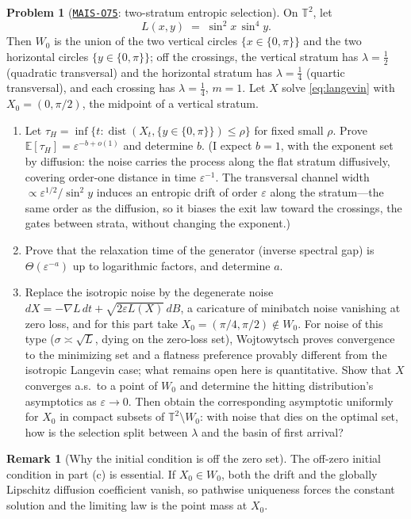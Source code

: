 \documentclass[11pt]{amsart}
\newcommand{\Oid}[1]{\href{https://github.com/lionellevine/MAIS/blob/main/open-problems/MAIS-O#1.md}{\texttt{MAIS-O#1}}}
\theoremstyle{plain}
\theoremstyle{definition}
\newtheorem{problem}[theorem]{Problem}
\newtheorem{remark}[theorem]{Remark}
\newcommand{\E}{\mathbb{E}}
\newcommand{\T}{\mathbb{T}}
\newcommand{\dist}{\operatorname{dist}}
\begin{document}
\begin{problem}[\Oid{75}: two-stratum entropic selection]\label{prob:entropic}
On $\T^2$, let
\[
   L(x, y) \;=\; \sin^2\! x \, \sin^4\! y .
\]
Then $W_0$ is the union of the two vertical circles $\{ x \in \{0, \pi\} \}$ and the two horizontal circles $\{ y \in \{0, \pi\} \}$; off the crossings, the vertical stratum has $\lambda = \tfrac12$ (quadratic transversal) and the horizontal stratum has $\lambda = \tfrac14$ (quartic transversal), and each crossing has $\lambda = \tfrac14$, $m = 1$. Let $X$ solve \eqref{eq:langevin} with $X_0 = (0, \pi/2)$, the midpoint of a vertical stratum.
\begin{enumerate}
\item[(a)] Let $\tau_H = \inf\{ t : \dist(X_t, \{ y \in \{0,\pi\} \}) \le \rho \}$ for fixed small $\rho$. Prove $\E[\tau_H] = \varepsilon^{-b + o(1)}$ and determine $b$. (I expect $b = 1$, with the exponent set by diffusion: the noise carries the process along the flat stratum diffusively, covering order-one distance in time $\varepsilon^{-1}$. The transversal channel width $\propto \varepsilon^{1/2} / \sin^2 y$ induces an entropic drift of order $\varepsilon$ along the stratum---the same order as the diffusion, so it biases the exit law toward the crossings, the gates between strata, without changing the exponent.)
\item[(b)] Prove that the relaxation time of the generator (inverse spectral gap) is $\Theta(\varepsilon^{-a})$ up to logarithmic factors, and determine $a$.
\item[(c)] Replace the isotropic noise by the degenerate noise $dX = -\nabla L\, dt + \sqrt{2 \varepsilon L(X)}\, dB$, a caricature of minibatch noise vanishing at zero loss, and for this part take $X_0=(\pi/4,\pi/2)\notin W_0$. For noise of this type ($\sigma \asymp \sqrt{L}$, dying on the zero-loss set), Wojtowytsch \cite{wojtowytsch2023} proves convergence to the minimizing set and a flatness preference provably different from the isotropic Langevin case; what remains open here is quantitative. Show that $X$ converges a.s.\ to a point of $W_0$ and determine the hitting distribution's asymptotics as $\varepsilon \to 0$. Then obtain the corresponding asymptotic uniformly for $X_0$ in compact subsets of $\T^2\setminus W_0$: with noise that dies on the optimal set, how is the selection split between $\lambda$ and the basin of first arrival?
\end{enumerate}
\end{problem}

\begin{remark}[Why the initial condition is off the zero set]
The off-zero initial condition in part (c) is essential. If $X_0\in W_0$, both the drift and the globally Lipschitz diffusion coefficient vanish, so pathwise uniqueness forces the constant solution and the limiting law is the point mass at $X_0$.
\end{remark}
\end{document}
